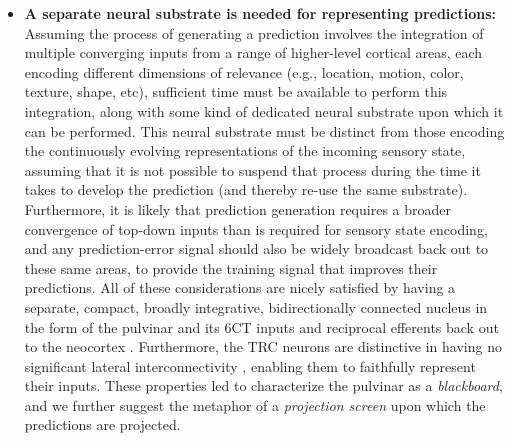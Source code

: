\documentclass[11pt,twoside]{article}
\newif\myifpdf
\begin{document}
\begin{itemize}
	\item {\bf A separate neural substrate is needed for representing predictions:} Assuming the process of generating a prediction involves the integration of multiple converging inputs from a range of higher-level cortical areas, each encoding different dimensions of relevance (e.g., location, motion, color, texture, shape, etc), sufficient time must be available to perform this integration, along with some kind of dedicated neural substrate upon which it can be performed.  This neural substrate must be distinct from those encoding the continuously evolving representations of the incoming sensory state, assuming that it is not possible to suspend that process during the time it takes to develop the prediction (and thereby re-use the same substrate).  Furthermore, it is likely that prediction generation requires a broader convergence of top-down inputs than is required for sensory state encoding, and any prediction-error signal should also be widely broadcast back out to these same areas, to provide the training signal that improves their predictions.  All of these considerations are nicely satisfied by having a separate, compact, broadly integrative, bidirectionally connected nucleus in the form of the pulvinar and its 6CT inputs and reciprocal efferents back out to the neocortex \citep{Shipp03}.  Furthermore, the TRC neurons are distinctive in having no significant lateral interconnectivity \citep{ShermanGuillery06}, enabling them to faithfully represent their inputs.  These properties led \citet{Mumford91} to characterize the pulvinar as a \emph{blackboard}, and we further suggest the metaphor of a \emph{projection screen} upon which the predictions are projected.


\end{itemize}
\end{document}
